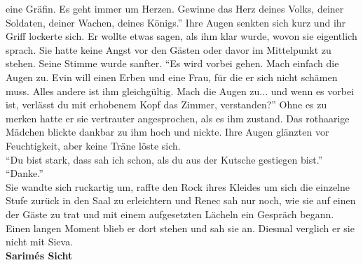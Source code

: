 eine Gräfin. Es geht immer um Herzen. Gewinne das Herz deines Volks, deiner Soldaten, deiner 
Wachen, deines Königs.''
Ihre Augen senkten sich kurz und ihr Griff lockerte sich. Er wollte etwas sagen, als ihm klar 
wurde, wovon sie eigentlich sprach. Sie hatte keine Angst vor den Gästen oder davor im Mittelpunkt 
zu stehen. Seine Stimme wurde sanfter. ``Es wird vorbei gehen. Mach einfach die Augen zu. Evin will 
einen Erben und eine Frau, für die er sich nicht schämen muss. Alles andere ist ihm gleichgültig. 
Mach die Augen zu... und wenn es vorbei ist, verlässt du mit erhobenem Kopf das Zimmer, 
verstanden?'' Ohne es zu merken hatte er sie vertrauter angesprochen, als es ihm zustand. Das 
rothaarige Mädchen blickte dankbar zu ihm hoch und nickte. Ihre Augen glänzten vor Feuchtigkeit, 
aber keine Träne löste sich.\\
``Du bist stark, dass sah ich schon, als du aus der Kutsche gestiegen bist.''\\
``Danke.''\\
Sie wandte sich ruckartig um, raffte den Rock ihres Kleides um sich die einzelne Stufe zurück in 
den Saal zu erleichtern und Renec sah nur noch, wie sie auf einen der Gäste zu trat und mit einem 
aufgesetzten Lächeln ein Gespräch begann. Einen langen Moment blieb er dort stehen und sah sie an. 
Diesmal verglich er sie nicht mit Sieva. \\


\textbf{Sarimés Sicht}


